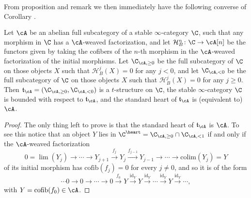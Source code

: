 From proposition  and remark  we then immediately have the following converse of Corollary .
\begin{proposition}\label{to.be.repeated.verbatim}
Let $\cA$ be an abelian full subcategory of a stable $\infty$-category $\C$, such that any morphism in $\C$ has a $\cA$-weaved factorization, and let
$\mathcal{H}^n_B\colon \C\to \cA[n]$ be the functors given by taking the cofibers of the $n$-th morphism in the $\cA$-weaved factorization of the initial morphisms. 
 Let
$\C_{\cA,\geq 0}$ be the full subcategory of $\C$ on those objects $X$ such that $\mathcal{H}^j_B(X)=0$ for any $j< 0$, and let $\C_{\cA,< 0}$ be the full subcategory of $\C$ on those objects $X$ such that $\mathcal{H}^j_B(X)=0$ for any $j\geq 0$. Then $\mathfrak{t}_{\cA}=(\C_{\cA,\geq 0}, \C_{\cA,<0})$ is a $t$-structure on $\C$, the stable $\infty$-category $\C$ is bounded with respect to $\mathfrak{t}_{\cA}$, and the standard heart of $\mathfrak{t}_{\cA}$ is (equivalent to) $\cA$.
\end{proposition}
\begin{proof}
The only thing left to prove is that the standard heart of  $\mathfrak{t}_\cA$ is $\cA$. To see this notice that an object $Y$ lies in $\C^\heart=\C_{\cA,\geq 0}\cap \C_{\cA,<1}$ if and only if the $\cA$-weaved factorization
\[
0 =\lim(Y_j)\to\cdots \to Y_{j+1} \xrightarrow{f_{j}} Y_{j} \xrightarrow{f_{j-1}}Y_{j-1}\to \cdots\to \mathrm{colim}(Y_j)=Y
\]
of its initial morphism has $\mathrm{cofib}(f_j)=0$ for every $j\neq0$, and so it is of the form
\[
\cdots 0 \to 0\to \cdots \to 0\xrightarrow{f_{0}} Y \xrightarrow{\mathrm{id}_Y}Y\xrightarrow{\mathrm{id}_Y} \cdots\xrightarrow{\mathrm{id}_Y}Y\xrightarrow{\mathrm{id}_Y}\cdots,\] 
with $Y=\mathrm{cofib}(f_0)\in \cA$.
\end{proof}


